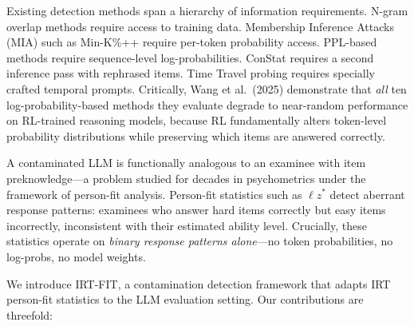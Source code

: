 \documentclass[11pt,a4paper]{article}
\begin{document}
Existing detection methods span a hierarchy of information requirements.
N-gram overlap methods require access to training data.
Membership Inference Attacks (MIA) such as Min-K\%++ \citep{shi2024detecting} require per-token probability access.
PPL-based methods require sequence-level log-probabilities.
ConStat \citep{dekoninck2024constat} requires a second inference pass with rephrased items.
Time Travel probing \citep{oren2024proving} requires specially crafted temporal prompts.
Critically, Wang et al.\ (2025) demonstrate that \emph{all} ten log-probability-based methods they evaluate degrade to near-random performance on RL-trained reasoning models, because RL fundamentally alters token-level probability distributions while preserving which items are answered correctly.

A contaminated LLM is functionally analogous to an examinee with item preknowledge---a problem studied for decades in psychometrics under the framework of person-fit analysis.
Person-fit statistics such as $\ell z^*$ \citep{snijders2001} detect aberrant response patterns: examinees who answer hard items correctly but easy items incorrectly, inconsistent with their estimated ability level.
Crucially, these statistics operate on \emph{binary response patterns alone}---no token probabilities, no log-probs, no model weights.

We introduce IRT-FIT, a contamination detection framework that adapts IRT person-fit statistics to the LLM evaluation setting.
Our contributions are threefold:
\end{document}
